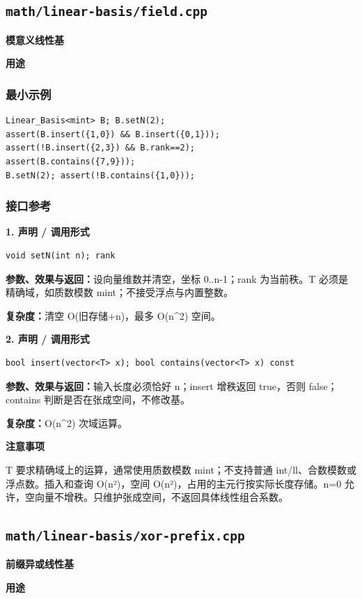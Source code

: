 \documentclass[UTF8,a4paper,10pt]{ctexart}
\newcommand{\TemplUsage}[1]{\textbf{用途}\par #1\par}
\newcommand{\TemplNote}[1]{\textbf{注意事项}\par #1\par}
\begin{document}
\subsection{\texttt{math/linear-basis/field.cpp}}
\textbf{模意义线性基}\par
\TemplUsage{}
\subsubsection*{最小示例}
\begin{lstlisting}
Linear_Basis<mint> B; B.setN(2);
assert(B.insert({1,0}) && B.insert({0,1}));
assert(!B.insert({2,3}) && B.rank==2);
assert(B.contains({7,9}));
B.setN(2); assert(!B.contains({1,0}));
\end{lstlisting}
\subsubsection*{接口参考}
\noindent\begin{minipage}{\textwidth}
\textbf{1. 声明 / 调用形式}
\begin{lstlisting}
void setN(int n); rank
\end{lstlisting}
\textbf{参数、效果与返回：}设向量维数并清空，坐标 0..n-1；rank 为当前秩。T 必须是精确域，如质数模数 mint；不接受浮点与内置整数。

\textbf{复杂度：}清空 O(旧存储+n)，最多 O(n\textasciicircum{}2) 空间。

\end{minipage}\par\vspace{0.4em}
\noindent\begin{minipage}{\textwidth}
\textbf{2. 声明 / 调用形式}
\begin{lstlisting}
bool insert(vector<T> x); bool contains(vector<T> x) const
\end{lstlisting}
\textbf{参数、效果与返回：}输入长度必须恰好 n；insert 增秩返回 true，否则 false；contains 判断是否在张成空间，不修改基。

\textbf{复杂度：}O(n\textasciicircum{}2) 次域运算。

\TemplNote{T 要求精确域上的运算，通常使用质数模数 mint；不支持普通 int/ll、合数模数或浮点数。插入和查询 O(n²)，空间 O(n²)，占用的主元行按实际长度存储。n=0 允许，空向量不增秩。只维护张成空间，不返回具体线性组合系数。}
\end{minipage}\par\vspace{0.4em}
\clearpage
\subsection{\texttt{math/linear-basis/xor-prefix.cpp}}
\textbf{前缀异或线性基}\par
\TemplUsage{}
\end{document}
